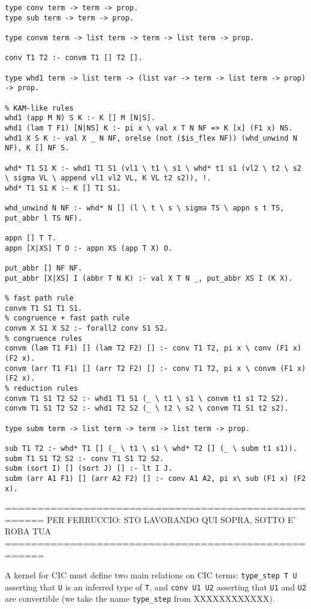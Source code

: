 \begin{verbatim}
type conv term -> term -> prop.
type sub term -> term -> prop.

type convm term -> list term -> term -> list term -> prop.

conv T1 T2 :- convm T1 [] T2 [].

type whd1 term -> list term -> (list var -> term -> list term -> prop) -> prop.

% KAM-like rules
whd1 (app M N) S K :- K [] M [N|S].
whd1 (lam T F1) [N|NS] K :- pi x \ val x T N NF => K [x] (F1 x) NS.
whd1 X S K :- val X _ N NF, orelse (not ($is_flex NF)) (whd_unwind N NF), K [] NF S.

whd* T1 S1 K :- whd1 T1 S1 (vl1 \ t1 \ s1 \ whd* t1 s1 (vl2 \ t2 \ s2 \ sigma VL \ append vl1 vl2 VL, K VL t2 s2)), !.
whd* T1 S1 K :- K [] T1 S1.

whd_unwind N NF :- whd* N [] (l \ t \ s \ sigma TS \ appn s t TS, put_abbr l TS NF).

appn [] T T.
appn [X|XS] T O :- appn XS (app T X) O.

put_abbr [] NF NF.
put_abbr [X|XS] I (abbr T N K) :- val X T N _, put_abbr XS I (K X).

% fast path rule
convm T1 S1 T1 S1.
% congruence + fast path rule
convm X S1 X S2 :- forall2 conv S1 S2.
% congruence rules
convm (lam T1 F1) [] (lam T2 F2) [] :- conv T1 T2, pi x \ conv (F1 x) (F2 x).
convm (arr T1 F1) [] (arr T2 F2) [] :- conv T1 T2, pi x \ convm (F1 x) (F2 x).
% reduction rules
convm T1 S1 T2 S2 :- whd1 T1 S1 (_ \ t1 \ s1 \ convm t1 s1 T2 S2).
convm T1 S1 T2 S2 :- whd1 T2 S2 (_ \ t2 \ s2 \ convm T1 S1 t2 s2).

type subm term -> list term -> term -> list term -> prop.

sub T1 T2 :- whd* T1 [] (_ \ t1 \ s1 \ whd* T2 [] (_ \ subm t1 s1)).
subm T1 S1 T2 S2 :- conv T1 S1 T2 S2.
subm (sort I) [] (sort J) [] :- lt I J.
subm (arr A1 F1) [] (arr A2 F2) [] :- conv A1 A2, pi x\ sub (F1 x) (F2 x).
\end{verbatim}


====================================================
PER FERRUCCIO: STO LAVORANDO QUI SOPRA, SOTTO E' ROBA TUA
====================================================

A kernel for CIC must define two main relations on CIC terms:
\verb+type_step T U+
asserting that \verb+U+ is an inferred type of \verb+T+,
and \verb+conv U1 U2+ 
asserting that \verb+U1+ and \verb+U2+ are convertible
(we take the name \verb+type_step+ from XXXXXXXXXXXX).

